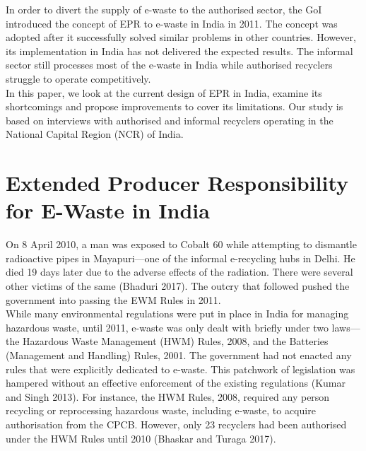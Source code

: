 \documentclass[a4paper, 12pt]{article}
\begin{document}
                    In order to divert the supply of e-waste to the authorised sector, the GoI introduced the concept of EPR to e-waste in India in 2011. The concept was adopted after it successfully solved similar problems in other countries. However, its implementation in India has not delivered the expected results. The informal sector still processes most of the e-waste in India while authorised recyclers struggle to operate competitively. \\
                    
                    In this paper, we look at the current design of EPR in India, examine its shortcomings and propose improvements to cover its limitations. Our study is based on interviews with authorised and informal recyclers operating in the National Capital Region (NCR) of India. \\ 
                    
                    \section{Extended Producer Responsibility for E-Waste in India}
                    
                    On 8 April 2010, a man was exposed to Cobalt 60 while attempting to dismantle radioactive pipes in Mayapuri—one of the informal e-recycling hubs in Delhi. He died 19 days later due to the adverse effects of the radiation. There were several other victims of the same (Bhaduri 2017). The outcry that followed pushed the government into passing the EWM Rules in 2011. \\
                    
                    While many environmental regulations were put in place in India for managing hazardous waste, until 2011, e-waste was only dealt with briefly under two laws—the Hazardous Waste Management (HWM) Rules, 2008, and the Batteries (Management and Handling) Rules, 2001. The government had not enacted any rules that were explicitly dedicated to e-waste. This patchwork of legislation was hampered without an effective enforcement of the existing regulations (Kumar and Singh 2013). For instance, the HWM Rules, 2008, required any person recycling or reprocessing hazardous waste, including e-waste, to acquire authorisation from the CPCB. However, only 23 recyclers had been authorised under the HWM Rules until 2010 (Bhaskar and Turaga 2017). \\
                    
\end{document}
